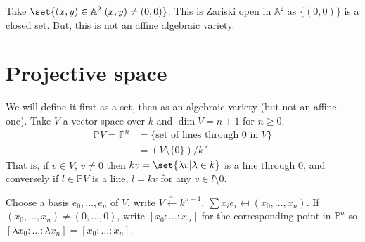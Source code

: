 \documentclass{article}
\newcommand{\A}{\mathbb{A}}
\begin{document}
\begin{warning}
    Take $\set{(x, y) \in \A^2 | (x, y) \neq (0, 0)}$. This is Zariski open in $\A^2$ as $\{(0, 0)\}$ is a closed set. But, this is not an affine algebraic variety.
\end{warning}

\clearpage
\color{black}
\section{Projective space}
We will define it first as a set, then as an algebraic variety (but not an affine one).
Take $V$ a vector space over $k$ and $\dim V = n+1$ for $n \geq 0$.
\begin{align*}
    \mathbb{P}V = \mathbb{P}^n &= \{\text{set of lines through } 0 \text{ in } V\} \\
                               &= (V \setminus \{0\}) /k^\times
\end{align*}
That is, if $v \in V$, $v \neq 0$ then $k v = \set{\lambda v | \lambda \in k}$ is a line through $0$, and conversely if $l \in \mathbb{P}V$ is a line, $l = kv$ for any $v \in l \setminus 0$.

Choose a basis $e_0, \dotsc, e_n$ of $V$, write $V \overset{\sim}{\leftarrow} k^{n+1}$, $\sum x_i e_i \mapsfrom (x_0, \dotsc, x_n)$.
If $(x_0, \dotsc, x_n) \neq (0, \dotsc, 0)$, write $[x_0: \dotsc: x_n]$ for the corresponding point in $\mathbb{P}^n$ so $[\lambda x_0: \dotsc: \lambda x_n] = [x_0: \dotsc : x_n]$.
\end{document}
